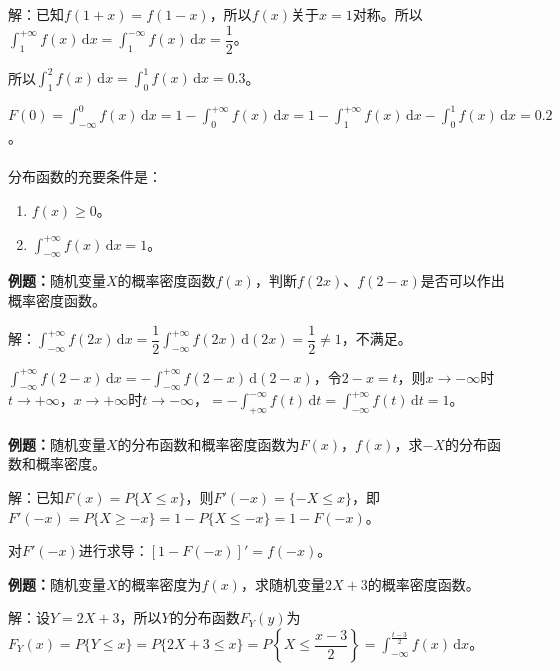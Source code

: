 解：已知$f(1+x)=f(1-x)$，所以$f(x)$关于$x=1$对称。所以$\int_1^{+\infty}f(x)\,\textrm{d}x=\int_1^{-\infty}f(x)\,\textrm{d}x=\dfrac{1}{2}$。

所以$\int_1^2f(x)\,\textrm{d}x=\int_0^1f(x)\,\textrm{d}x=0.3$。

$F(0)=\int_{-\infty}^0f(x)\,\textrm{d}x=1-\int_0^{+\infty}f(x)\,\textrm{d}x=1-\int_1^{+\infty}f(x)\,\textrm{d}x-\int_0^1f(x)\,\textrm{d}x=0.2$。

\paragraph{}

分布函数的充要条件是：

\begin{enumerate}
    \item $f(x)\geqslant0$。
    \item $\int_{-\infty}^{+\infty}f(x)\,\textrm{d}x=1$。
\end{enumerate}

\textbf{例题：}随机变量$X$的概率密度函数$f(x)$，判断$f(2x)$、$f(2-x)$是否可以作出概率密度函数。

解：$\int_{-\infty}^{+\infty}f(2x)\,\textrm{d}x=\dfrac{1}{2}\int_{-\infty}^{+\infty}f(2x)\,\textrm{d}(2x)=\dfrac{1}{2}\neq1$，不满足。

$\int_{-\infty}^{+\infty}f(2-x)\,\textrm{d}x=-\int_{-\infty}^{+\infty}f(2-x)\,\textrm{d}(2-x)$，令$2-x=t$，则$x\to-\infty$时$t\to+\infty$，$x\to+\infty$时$t\to-\infty$，$=-\int_{+\infty}^{-\infty}f(t)\,\textrm{d}t=\int_{-\infty}^{+\infty}f(t)\,\textrm{d}t=1$。

\paragraph{}

\textbf{例题：}随机变量$X$的分布函数和概率密度函数为$F(x)$，$f(x)$，求$-X$的分布函数和概率密度。

解：已知$F(x)=P\{X\leqslant x\}$，则$F'(-x)=\{-X\leqslant x\}$，即$F'(-x)=P\{X\geqslant-x\}=1-P\{X\leqslant-x\}=1-F(-x)$。

对$F'(-x)$进行求导：$[1-F(-x)]'=f(-x)$。

\textbf{例题：}随机变量$X$的概率密度为$f(x)$，求随机变量$2X+3$的概率密度函数。

解：设$Y=2X+3$，所以$Y$的分布函数$F_Y(y)$为$F_Y(x)=P\{Y\leqslant x\}=P\{2X+3\leqslant x\}=P\left\{X\leqslant\dfrac{x-3}{2}\right\}=\int_{-\infty}^{\frac{t-3}{2}}f(x)\,\textrm{d}x$。

